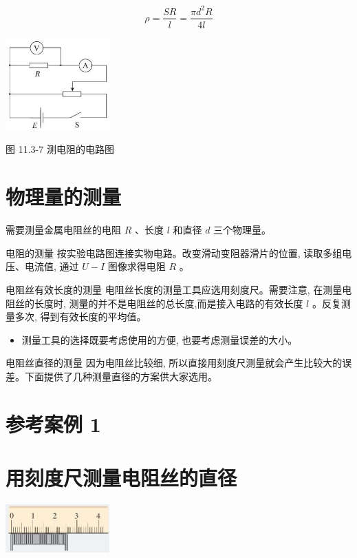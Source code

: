\documentclass[10pt]{article}
\begin{document}
\[
\rho = \frac{SR}{l} = \frac{\pi {d}^{2}R}{4l}
\]

\begin{center}
\includegraphics[max width=0.3\textwidth]{images/01911d5f-8e38-70c0-b5b8-2b399bd115b6_70_208871.jpg}
\end{center}

图 11.3-7 测电阻的电路图

\section*{物理量的测量}

需要测量金属电阻丝的电阻 \(R\) 、长度 \(l\) 和直径 \(d\) 三个物理量。

电阻的测量 按实验电路图连接实物电路。改变滑动变阻器滑片的位置, 读取多组电压、电流值, 通过 \(U - I\) 图像求得电阻 \(R\) 。

电阻丝有效长度的测量 电阻丝长度的测量工具应选用刻度尺。需要注意, 在测量电阻丝的长度时, 测量的并不是电阻丝的总长度,而是接入电路的有效长度 \(l\) 。反复测量多次, 得到有效长度的平均值。

\begin{mdframed}

\begin{itemize}
\item 测量工具的选择既要考虑使用的方便, 也要考虑测量误差的大小。
\end{itemize}

\end{mdframed}

电阻丝直径的测量 因为电阻丝比较细, 所以直接用刻度尺测量就会产生比较大的误差。下面提供了几种测量直径的方案供大家选用。

\section*{参考案例 1}

\section*{用刻度尺测量电阻丝的直径}

\begin{center}
\includegraphics[max width=0.3\textwidth]{images/01911d5f-8e38-70c0-b5b8-2b399bd115b6_71_827944.jpg}
\end{center}
\end{document}
